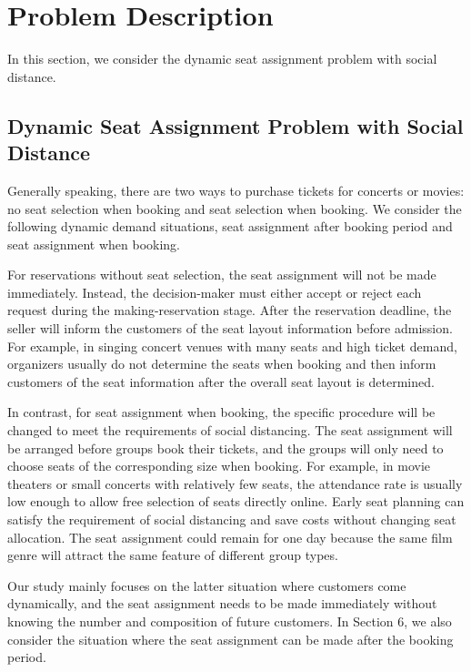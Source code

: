 \section{Problem Description}
In this section, we consider the dynamic seat assignment problem with social distance.



\subsection{Dynamic Seat Assignment Problem with Social Distance}\label{dynamic_demand}

Generally speaking, there are two ways to purchase tickets for concerts or movies: no seat selection when booking and seat selection when booking. We consider the following dynamic demand situations, seat assignment after booking period and seat assignment when booking.

For reservations without seat selection, the seat assignment will not be made immediately. Instead, the decision-maker must either accept or reject each request during the making-reservation stage. After the reservation deadline, the seller will inform the customers of the seat layout information before admission. For example, in singing concert venues with many seats and high ticket demand, organizers usually do not determine the seats when booking and then inform customers of the seat information after the overall seat layout is determined.

In contrast, for seat assignment when booking, the specific procedure will be changed to meet the requirements of social distancing. The seat assignment will be arranged before groups book their tickets, and the groups will only need to choose seats of the corresponding size when booking. For example, in movie theaters or small concerts with relatively few seats, the attendance rate is usually low enough to allow free selection of seats directly online. Early seat planning can satisfy the requirement of social distancing and save costs without changing seat allocation. The seat assignment could remain for one day because the same film genre will attract the same feature of different group types.

Our study mainly focuses on the latter situation where customers come dynamically, and the seat assignment needs to be made immediately without knowing the number and composition of future customers. In Section 6, we also consider the situation where the seat assignment can be made after the booking period.


